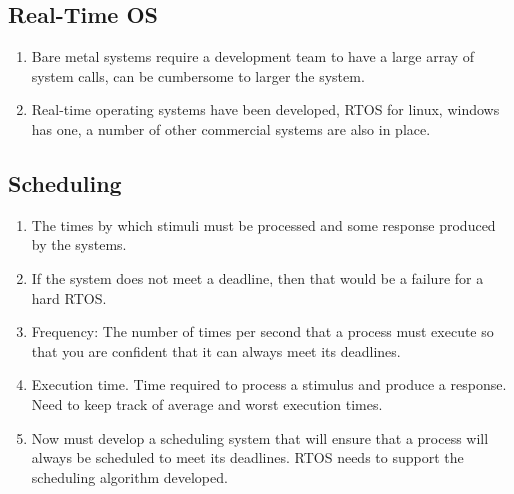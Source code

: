 \documentclass{article}
\begin{document}
\subsection{Real-Time OS}
\begin{enumerate}
\item Bare metal systems require a development team to have a large array of system calls, can be cumbersome to larger the system.
\item Real-time operating systems have been developed, RTOS for linux, windows has one, a number of other commercial systems are also in place.
\end{enumerate}
\subsection{Scheduling}
\begin{enumerate}
\item The times by which stimuli must be processed and some response produced by the systems.
\item If the system does not meet a deadline, then that would be a failure for a hard RTOS.
\item Frequency:  The number of times per second that a process must execute so that you are confident that it can always meet its deadlines.
\item Execution time.  Time required to process a stimulus and produce a response.  Need to keep track of average and worst execution times.
\item Now must develop a scheduling system that will ensure that a process will always be scheduled to meet its deadlines.  RTOS needs to support the scheduling algorithm developed.
\end{enumerate}
\end{document}
